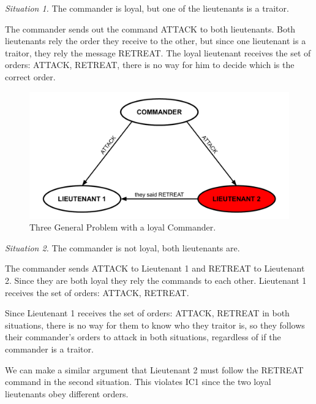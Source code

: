 \documentclass[10pt]{amsart}
\begin{document}
\noindent \emph{Situation 1.} The commander is loyal, but one of the lieutenants is a traitor.

\begin{minipage}{.95\textwidth}%
    The commander sends out the command ATTACK to both lieutenants. Both lieutenants rely the order
    they receive to the other, but since one lieutenant is a traitor, they rely the message RETREAT.
    The loyal lieutenant receives the set of orders: {ATTACK, RETREAT}, there is no way for him
    to decide which is the correct order. 
\end{minipage}%

\pagebreak

\begin{figure}[h!]
    \centering
    \includegraphics[scale=.6]{../figures/three_generals_loyal_commander.pdf}
    \caption{Three General Problem with a loyal Commander.}
\end{figure}


\noindent \emph{Situation 2.} The commander is not loyal, both lieutenants are.

\begin{minipage}{.95\textwidth}%
    The commander sends ATTACK to Lieutenant 1 and RETREAT to Lieutenant 2. Since they are both loyal
    they rely the commands to each other. Lieutenant 1 receives the set of orders: {ATTACK, RETREAT}.

    Since Lieutenant 1 receives the set of orders: {ATTACK, RETREAT} in both situations, there is no
    way for them to know who they traitor is, so they follows their commander's orders to attack in 
    both situations, regardless of if the commander is a traitor.

    We can make a similar argument that Lieutenant 2 must follow the RETREAT command in the second
    situation. This violates IC1 since the two loyal lieutenants obey different orders. 
\end{minipage}%
\end{document}
